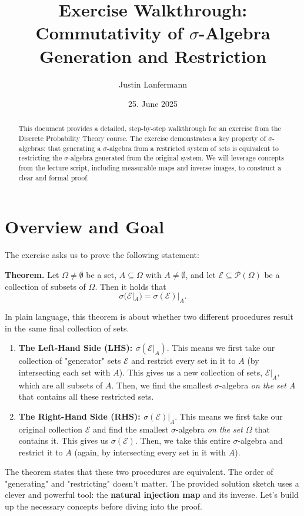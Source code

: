 \documentclass[11pt,a4paper]{article}
\title{Exercise Walkthrough: Commutativity of $\sigma$-Algebra Generation and Restriction}
\author{Justin Lanfermann}
\date{25. June 2025}
\begin{document}
\maketitle

\begin{abstract}
    This document provides a detailed, step-by-step walkthrough for an exercise from the Discrete Probability Theory course. The exercise demonstrates a key property of $\sigma$-algebras: that generating a $\sigma$-algebra from a restricted system of sets is equivalent to restricting the $\sigma$-algebra generated from the original system. We will leverage concepts from the lecture script, including measurable maps and inverse images, to construct a clear and formal proof.
\end{abstract}

\section{Overview and Goal}

The exercise asks us to prove the following statement:
\vspace{1em}

\noindent\textbf{Theorem.} Let $\Omega \neq \emptyset$ be a set, $A \subseteq \Omega$ with $A \neq \emptyset$, and let $\mathcal{E} \subseteq \mathcal{P}(\Omega)$ be a collection of subsets of $\Omega$. Then it holds that
\[
    \sigma(\mathcal{E}|_A) = \sigma(\mathcal{E})|_A .
\]
\vspace{1em}

In plain language, this theorem is about whether two different procedures result in the same final collection of sets.
\begin{enumerate}
    \item \textbf{The Left-Hand Side (LHS): $\sigma(\mathcal{E}|_A)$}. This means we first take our collection of "generator" sets $\mathcal{E}$ and restrict every set in it to $A$ (by intersecting each set with $A$). This gives us a new collection of sets, $\mathcal{E}|_A$, which are all subsets of $A$. Then, we find the smallest $\sigma$-algebra \emph{on the set A} that contains all these restricted sets.

    \item \textbf{The Right-Hand Side (RHS): $\sigma(\mathcal{E})|_A$}. This means we first take our original collection $\mathcal{E}$ and find the smallest $\sigma$-algebra \emph{on the set $\Omega$} that contains it. This gives us $\sigma(\mathcal{E})$. Then, we take this entire $\sigma$-algebra and restrict it to $A$ (again, by intersecting every set in it with $A$).
\end{enumerate}
The theorem states that these two procedures are equivalent. The order of "generating" and "restricting" doesn't matter. The provided solution sketch uses a clever and powerful tool: the \textbf{natural injection map} and its inverse. Let's build up the necessary concepts before diving into the proof.
\end{document}

